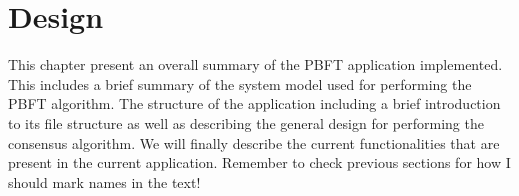 \chapter{Design}
\label{chapter:Design}

This chapter present an overall summary of the PBFT application implemented. This includes a brief summary of the system model used for performing the PBFT algorithm. The structure of the application including a brief introduction to its file structure as well as describing the general design for performing the consensus algorithm. We will finally describe the current functionalities that are present in the current application. 
Remember to check previous sections for how I should mark names in the text!
